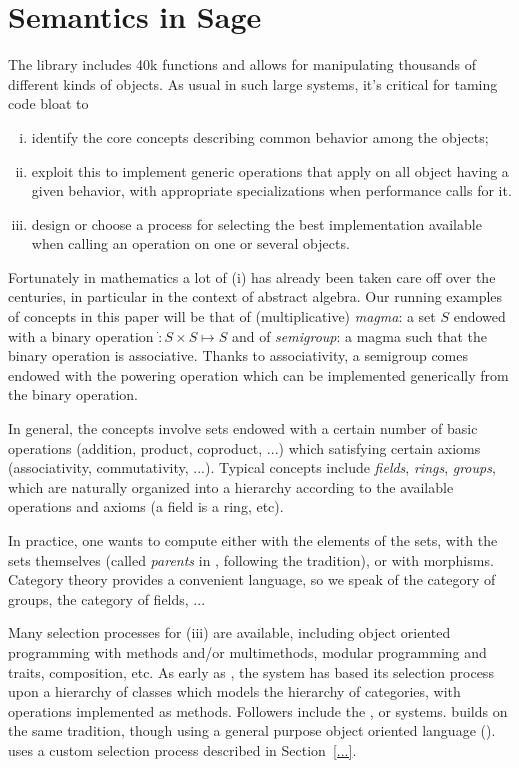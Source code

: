 \section{Semantics in Sage}

The \Sage library includes 40k functions and allows for manipulating
thousands of different kinds of objects. As usual in such large
systems, it's critical for taming code bloat to
\begin{enumerate}[(i)]
\item identify the core concepts describing common behavior among the
  objects;
\item exploit this to implement generic operations that apply on all
  object having a given behavior, with appropriate specializations
  when performance calls for it.
\item design or choose a process for selecting the best implementation
  available when calling an operation on one or several objects.
\end{enumerate}

Fortunately in mathematics a lot of (i) has already been taken care
off over the centuries, in particular in the context of abstract
algebra. Our running examples of concepts in this paper will be that
of (multiplicative) \emph{magma}: a set $S$ endowed with a binary
operation $\dot: S\times S \mapsto S$ and of \emph{semigroup}: a magma
such that the binary operation is associative. Thanks to
associativity, a semigroup comes endowed with the powering operation
which can be implemented generically from the binary operation.


In general, the concepts involve sets endowed with a certain number of
basic operations (addition, product, coproduct, ...) which satisfying
certain axioms (associativity, commutativity, ...). Typical concepts
include \emph{fields}, \emph{rings}, \emph{groups}, which are
naturally organized into a hierarchy according to the available
operations and axioms (a field is a ring, etc).

In practice, one wants to compute either with the elements of the
sets, with the sets themselves (called \emph{parents} in \Sage,
following the \Magma tradition), or with morphisms. Category theory
provides a convenient language, so we speak of the category of groups,
the category of fields, ...

Many selection processes for (iii) are available, including object
oriented programming with methods and/or multimethods, modular
programming and traits, composition, etc. As early as , the \Axiom system has based its selection process upon a
hierarchy of classes which models the hierarchy of categories, with
operations implemented as methods. Followers include the \MuPAD, or
\Fricas systems. \Sage builds on the same tradition, though using a
general purpose object oriented language (\Python). \GAP uses a custom
selection process described in Section~\ref{...}.

